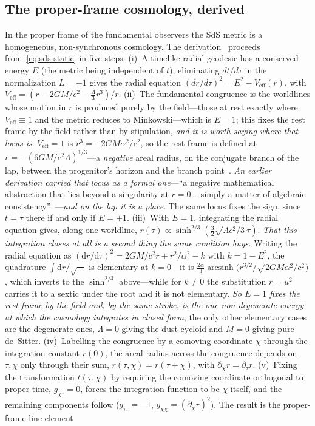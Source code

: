 \documentclass[11pt,a4paper]{article}
\theoremstyle{plain}
\theoremstyle{definition}
\theoremstyle{remark}
\newcommand{\dd}{\mathrm{d}}   %
\begin{document}
\subsection{The proper-frame cosmology, derived}\label{sec:properframe}
In the proper frame of the fundamental observers the SdS metric is a homogeneous, non-synchronous cosmology. The derivation~\cite{Janzen2015} proceeds from~\eqref{eq:sds-static} in five steps. (i)~A timelike radial geodesic has a conserved energy $E$ (the metric being independent of $t$); eliminating $dt/d\tau$ in the normalization $L=-1$ gives the radial equation $(dr/d\tau)^2=E^2-V_{\mathrm{eff}}(r)$, with $V_{\mathrm{eff}}=(r-2GM/c^2-\tfrac\Lambda3 r^3)/r$. (ii)~The fundamental congruence is the worldlines whose motion in $r$ is produced purely by the field---those at rest exactly where $V_{\mathrm{eff}}\equiv1$ and the metric reduces to Minkowski---which is $E=1$; this fixes the rest frame by the field rather than by stipulation, \emph{and it is worth saying where that locus is}: $V_{\mathrm{eff}}=1$ is $r^{3}=-2GM\alpha^{2}/c^{2}$, so the rest frame is defined at $r=-(6GM/c^{2}\Lambda)^{1/3}$---a \emph{negative} areal radius, on the conjugate branch of the lap, between the progenitor's horizon and the branch point~\cite{JanzenCRframework}. \emph{An earlier derivation carried that locus as a formal one}---``a negative mathematical abstraction that lies beyond a singularity at $r=0$\dots\ simply a matter of algebraic consistency''~\cite[App.]{JanzenFQXi2012}---\emph{and on the lap it is a place}. The same locus fixes the sign, since $t=\tau$ there if and only if $E=+1$. (iii)~With $E=1$, integrating the radial equation gives, along one worldline, $r(\tau)\propto\sinh^{2/3}(\tfrac32\sqrt{\Lambda c^2/3}\,\tau)$. \emph{That this integration closes at all is a second thing the same condition buys.} Writing the radial equation as $(\dd r/\dd\tau)^{2}=2GM/c^{2}r+r^{2}/\alpha^{2}-k$ with $k=1-E^{2}$, the quadrature $\int\dd r/\sqrt{\;\cdot\;}$ is elementary at $k=0$---it is $\tfrac{2\alpha}{3}\operatorname{arcsinh}\bigl(r^{3/2}/\sqrt{2GM\alpha^{2}/c^{2}}\bigr)$, which inverts to the $\sinh^{2/3}$ above---while for $k\neq0$ the substitution $r=u^{2}$ carries it to a sextic under the root and it is not elementary. \emph{So $E=1$ fixes the rest frame by the field and, by the same stroke, is the one non-degenerate energy at which the cosmology integrates in closed form}; the only other elementary cases are the degenerate ones, $\Lambda=0$ giving the dust cycloid and $M=0$ giving pure de~Sitter. (iv)~Labelling the congruence by a comoving coordinate $\chi$ through the integration constant $r(0)$, the areal radius across the congruence depends on $\tau,\chi$ only through their sum, $r(\tau,\chi)=r(\tau+\chi)$, with $\partial_\chi r=\partial_\tau r$. (v)~Fixing the transformation $t(\tau,\chi)$ by requiring the comoving coordinate orthogonal to proper time, $g_{\chi\tau}=0$, forces the integration function to be $\chi$ itself, and the remaining components follow ($g_{\tau\tau}=-1$, $g_{\chi\chi}=(\partial_\chi r)^2$). The result is the proper-frame line element
\end{document}
